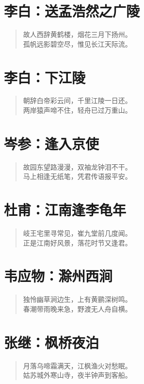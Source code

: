 \documentclass[12pt,oneside]{book}
\newenvironment{shici}{
\begin{verse}
\centering\large\hspace{12pt}}
{\end{verse}}
\begin{document}
\chapter{李白：送孟浩然之广陵}
\begin{shici}
故人西辞黄鹤楼，烟花三月下扬州。\\
孤帆远影碧空尽，惟见长江天际流。
\end{shici}

\chapter{李白：下江陵}
\begin{shici}
朝辞白帝彩云间，千里江陵一日还。\\
两岸猿声啼不住，轻舟已过万重山。
\end{shici}

\chapter{岑参：逢入京使}
\begin{shici}
故园东望路漫漫，双袖龙钟泪不干。\\
马上相逢无纸笔，凭君传语报平安。
\end{shici}

\chapter{杜甫：江南逢李龟年}
\begin{shici}
岐王宅里寻常见，崔九堂前几度闻。\\
正是江南好风景，落花时节又逢君。
\end{shici}

\chapter{韦应物：滁州西涧}
\begin{shici}
独怜幽草涧边生，上有黄鹂深树鸣。\\
春潮带雨晚来急，野渡无人舟自横。
\end{shici}

\chapter{张继：枫桥夜泊}
\begin{shici}
月落乌啼霜满天，江枫渔火对愁眠。\\
姑苏城外寒山寺，夜半钟声到客船。
\end{shici}
\end{document}
